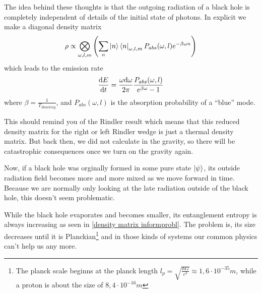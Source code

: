 	The idea behind these thoughts is that the outgoing radiation of a black hole is completely independent of details of the initial state of photons. 
	In explicit we make a diagonal density matrix
		\begin{equation} \label{density matrix informprobl}
			\rho \propto \bigotimes_{\omega, l, m} \left(
			\sum_n \ket{n} \bra{n}_{\omega, l, m} P_{abs} (\omega, l) e^{-\beta \omega n}
			\right)
		\end{equation}
	which leads to the emission rate 
		\begin{equation}
			\frac{\mathrm{d} E}{\mathrm{d} t} = 
			\frac{\omega \mathrm{d} \omega}{2\pi} 
			\frac{P_{abs}(\omega, l)}{e^{\beta \omega}-1}
		\end{equation}
	where $\beta = \frac{1}{T_{Hawking}}$, and $P_{abs}(\omega, l)$ is the absorption
	probability of a ``blue'' mode.
		
	This should remind you of the Rindler result which means that this reduced density matrix for the right or left Rindler wedge is just a thermal density matrix. But back then, we did not calculate in the gravity, so there will be catastrophic consequences once we turn on the gravity again.
		
	Now, if a black hole was orginally formed in some pure state $\ket{\psi}$, its outside radiation field becomes more and more mixed as we move forward in time. Because we are normally only looking at the late radiation outside of the black hole, this doesn't seem problematic. 
		
	While the black hole evaporates and becomes smaller, its entanglement entropy is always increasing as seen in \eqref{density matrix informprobl}. The problem is, its size decreases until it is Planckian\footnote{The planck scale beginns at the planck length $l_p = \sqrt{\frac{\hbar G}{c^3}} \approx 1,6 \cdot 10^{-35}m$, while a proton is about the size of $8,4 \cdot 10^{-16}m$} and in those kinds of systems our common physics can't help us any more.
	
